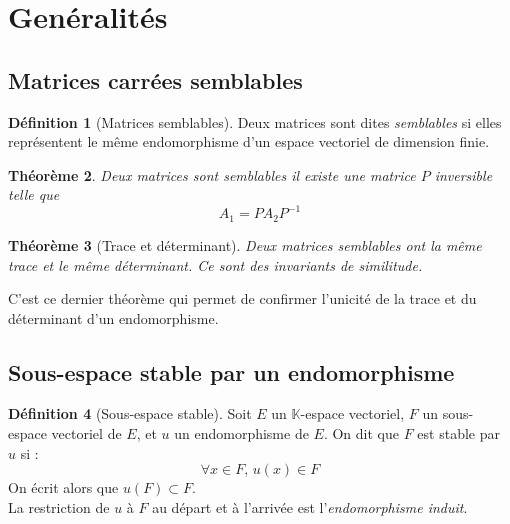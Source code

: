 \documentclass[11pt,a4paper]{report}
\newtheorem{theorem}{Théorème}[chapter]
\newtheorem{itheorem}[theorem]{Théorème}
\theoremstyle{definition}
\newtheorem{dfn}[theorem]{Définition}
\begin{document}
\section{Genéralités}
%
\subsection{Matrices carrées semblables} %
\label{sub:matrices_carrees_semblables}
\begin{dfn}[Matrices semblables]
     Deux matrices sont dites \emph{semblables} si elles représentent le même endomorphisme d'un espace vectoriel de dimension finie.
\end{dfn}
\begin{theorem}
     Deux matrices sont \emph{semblables} \Longleftrightarrow il existe une matrice $P$ inversible telle que 
     \begin{equation}
     A_1 = P A_2 P^{-1}
     \end{equation}
\end{theorem}
\begin{itheorem}[Trace et déterminant]
     Deux matrices semblables ont la même trace et le même déterminant. Ce sont des \emph{invariants de similitude}.%
\end{itheorem}
C'est ce dernier théorème qui permet de confirmer l'unicité de la trace et du déterminant d'un endomorphisme.

\subsection{Sous-espace stable par un endomorphisme} %
\label{sub:sous_espace_stable_par_un_endomorphisme}
\begin{dfn}[Sous-espace stable]
     Soit $E$ un $\mathbb{K}$-espace vectoriel, $F$ un sous-espace vectoriel de $E$, et $u$ un endomorphisme de $E$.\newline
     On dit que $F$ est stable par $u$ si :
     \begin{equation}
     \forall x \in F, \, u(x) \in F
     \end{equation}
     On écrit alors que $u(F) \subset F$.\\[0.6\baselineskip]

     La restriction de $u$ à $F$ au départ et à l'arrivée est l'\emph{endomorphisme induit}.
\end{dfn}
\end{document}
